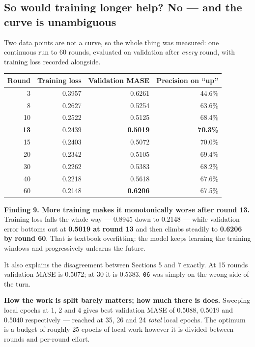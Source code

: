 \documentclass[11pt,a4paper]{article}
\newcommand{\keypoint}[1]{%
  \par\vspace{0.4em}%
  \noindent\colorbox{fed!8}{\parbox{0.98\textwidth}{\vspace{0.2em}#1\vspace{0.2em}}}%
  \par\vspace{0.4em}}
\begin{document}
\subsection{So would training longer help? No --- and the curve is unambiguous}

Two data points are not a curve, so the whole thing was measured: one continuous run to 60 rounds,
evaluated on validation after \emph{every} round, with training loss recorded alongside.

\begin{center}
\small
\begin{tabular}{@{}rrrr@{}}
\toprule
\textbf{Round} & \textbf{Training loss} & \textbf{Validation MASE} & \textbf{Precision on ``up''} \\
\midrule
3 & 0.3957 & 0.6261 & 44.6\% \\
8 & 0.2627 & 0.5254 & 63.6\% \\
10 & 0.2522 & 0.5125 & 68.4\% \\
\textbf{13} & 0.2439 & \textbf{0.5019} & \textbf{70.3\%} \\
15 & 0.2403 & 0.5072 & 70.0\% \\
20 & 0.2342 & 0.5105 & 69.4\% \\
30 & 0.2262 & 0.5383 & 68.2\% \\
40 & 0.2218 & 0.5618 & 67.6\% \\
60 & 0.2148 & \textbf{0.6206} & 67.5\% \\
\bottomrule
\end{tabular}
\end{center}

\keypoint{\textbf{Finding 9. More training makes it monotonically worse after round 13.} Training loss
falls the whole way --- 0.8945 down to 0.2148 --- while validation error bottoms out at
\textbf{0.5019 at round 13} and then climbs steadily to \textbf{0.6206 by round 60}. That is textbook
overfitting: the model keeps learning the training windows and progressively unlearns the future.

It also explains the disagreement between Sections 5 and 7 exactly. At 15 rounds validation MASE is
0.5072; at 30 it is 0.5383. \texttt{06} was simply on the wrong side of the turn.}

\textbf{How the work is split barely matters; how much there is does.} Sweeping local epochs at 1, 2
and 4 gives best validation MASE of 0.5088, 0.5019 and 0.5040 respectively --- reached at 35, 26 and 24
\emph{total} local epochs. The optimum is a budget of roughly 25 epochs of local work however it is
divided between rounds and per-round effort.
\end{document}
